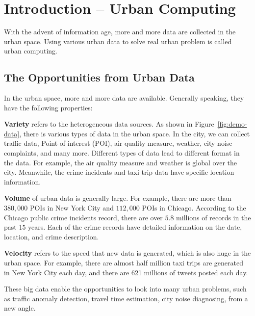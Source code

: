 \chapter{Introduction -- Urban Computing} \label{chapter1:introduction}



With the advent of information age, more and more data are collected in the urban space. Using various urban data to solve real urban problem is called urban computing.



\section{The Opportunities from Urban Data}


In the urban space, more and more  data are available. Generally speaking, they have the following properties:

\textbf{Variety} refers to the heterogeneous data sources. As shown in Figure~\ref{fig:demo-data}, there is various types of data in the urban space. In the city, we can collect traffic data, Point-of-interest (POI), air quality measure, weather,  city noise complaints, and many more. Different types of data lead to different format in the data. For example, the air quality measure and weather is global over the city. Meanwhile, the crime incidents and taxi trip data have specific location information.


\textbf{Volume} of urban data is generally large. For example, there are more than $380,000$ POIs in New York City and $112,000$ POIs in Chicago. According to the Chicago public crime incidents record, there are over $5.8$ millions of records in the past 15 years. Each of the crime records have detailed information on the date, location, and crime description. 


\textbf{Velocity} refers to the speed that new data is generated, which is also huge in the urban space. For example, there are almost half million taxi trips are generated in New York City each day, and there are 621 millions of tweets posted each day.

These big data enable the opportunities to look into many urban problems, such as traffic anomaly detection,  travel time estimation, city noise diagnosing, from a new angle.


